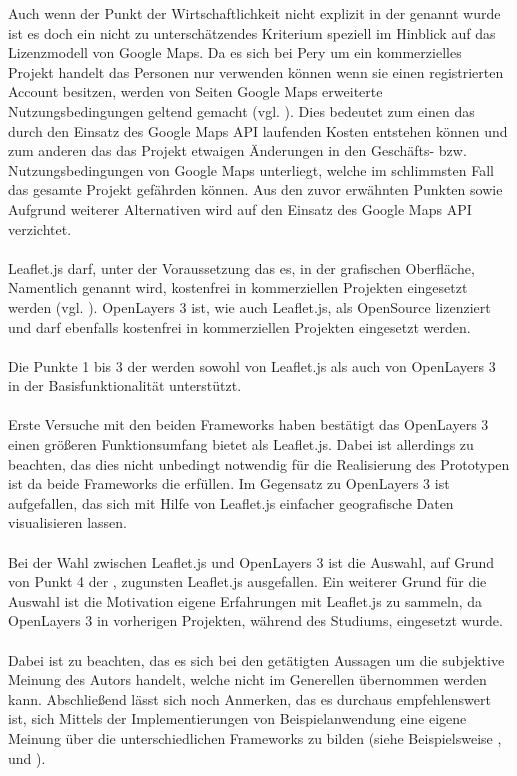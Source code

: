 \documentclass[../Bachelorarbeit.tex]{subfiles}
\begin{document}
Auch wenn der Punkt der Wirtschaftlichkeit nicht explizit in der  genannt wurde ist es doch ein nicht zu unterschätzendes Kriterium speziell im Hinblick auf das Lizenzmodell von Google Maps.
Da es sich bei Pery um ein kommerzielles Projekt handelt das Personen nur verwenden können wenn sie einen registrierten Account besitzen, werden von Seiten Google Maps erweiterte Nutzungsbedingungen geltend gemacht (vgl. \cite[Abschnitt: Can I use the Google Maps APIs on a site that is password protected?]{GoogleMapsApiUsage}). 
Dies bedeutet zum einen das durch den Einsatz des Google Maps API laufenden Kosten entstehen können und zum anderen das das Projekt etwaigen Änderungen in den Geschäfts- bzw. Nutzungsbedingungen von Google Maps unterliegt, welche im schlimmsten Fall das gesamte Projekt gefährden können.
Aus den zuvor erwähnten Punkten sowie Aufgrund weiterer Alternativen wird auf den Einsatz des Google Maps API verzichtet.\\
\\
Leaflet.js darf, unter der Voraussetzung das es, in der grafischen Oberfläche, Namentlich genannt wird, kostenfrei in kommerziellen Projekten eingesetzt werden (vgl. \cite[Abschnitt: Commercial Use and Licensing]{LeafletLicense}).
OpenLayers 3 ist, wie auch Leaflet.js, als OpenSource lizenziert und darf ebenfalls kostenfrei in kommerziellen Projekten eingesetzt werden.\\
\\
Die Punkte 1 bis 3 der  werden sowohl von Leaflet.js als auch von OpenLayers 3 in der Basisfunktionalität unterstützt.\\
\\
Erste Versuche mit den beiden Frameworks haben bestätigt das OpenLayers 3 einen größeren Funktionsumfang bietet als Leaflet.js. 
Dabei ist allerdings zu beachten, das dies nicht unbedingt notwendig für die Realisierung des Prototypen ist da beide Frameworks die  erfüllen. 
Im Gegensatz zu OpenLayers 3 ist aufgefallen, das sich mit Hilfe von Leaflet.js einfacher geografische Daten visualisieren lassen.\\
\\
Bei der Wahl zwischen Leaflet.js und OpenLayers 3 ist die Auswahl, auf Grund von Punkt 4 der , zugunsten Leaflet.js ausgefallen. 
Ein weiterer Grund für die Auswahl ist die Motivation eigene Erfahrungen mit Leaflet.js zu sammeln, da OpenLayers 3 in vorherigen Projekten, während des Studiums, eingesetzt wurde.\\
\\
Dabei ist zu beachten, das es sich bei den getätigten Aussagen um die subjektive Meinung des Autors handelt, welche nicht im Generellen übernommen werden kann.
Abschließend lässt sich noch Anmerken, das es durchaus empfehlenswert ist, sich Mittels der Implementierungen von Beispielanwendung eine eigene Meinung über die unterschiedlichen Frameworks zu bilden (siehe Beispielsweise \cite{OpenlayersExamples}, \cite{LeafletTutorials} und \cite{GoogleMapsExamples}).



 
\end{document}
